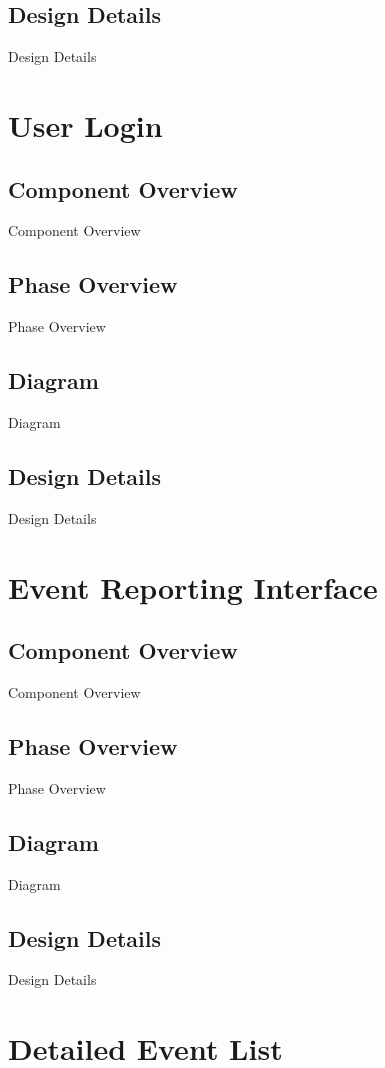 \subsection{Design Details}
Design Details

\section{User Login }

\subsection{Component  Overview}
Component Overview
\subsection{Phase Overview}
Phase Overview
\subsection{Diagram}
Diagram
\subsection{Design Details}
Design Details

\section{Event Reporting Interface }

\subsection{Component  Overview}
Component Overview
\subsection{Phase Overview}
Phase Overview
\subsection{Diagram}
Diagram
\subsection{Design Details}
Design Details

\section{Detailed Event List }

